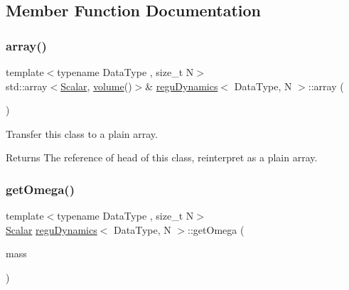 \subsection{Member Function Documentation}
\mbox{\label{classregu_dynamics_aa1c12cfc524f02a52590b2659db79795}} 
\subsubsection{\texorpdfstring{array()}{array()}}
{\footnotesize\ttfamily template$<$typename Data\+Type , size\+\_\+t N$>$ \\
std\+::array$<$\mbox{\hyperlink{classregu_dynamics_a359c55370b4dee032396f0df86ad5fab}{Scalar}}, \mbox{\hyperlink{classregu_dynamics_a3a00b2009ce88898871ca024c30c6882}{volume}}()$>$\& \mbox{\hyperlink{classregu_dynamics}{regu\+Dynamics}}$<$ Data\+Type, N $>$\+::array (\begin{DoxyParamCaption}{ }\end{DoxyParamCaption})\hspace{0.3cm}{\ttfamily [inline]}}



Transfer this class to a plain array. 

\begin{DoxyReturn}{Returns}
The reference of head of this class, reinterpret as a plain array. 
\end{DoxyReturn}
\mbox{\label{classregu_dynamics_a0fe3b4f9a468687ec1f004120b347ddd}} 
\subsubsection{\texorpdfstring{get\+Omega()}{getOmega()}}
{\footnotesize\ttfamily template$<$typename Data\+Type , size\+\_\+t N$>$ \\
\mbox{\hyperlink{classregu_dynamics_a359c55370b4dee032396f0df86ad5fab}{Scalar}} \mbox{\hyperlink{classregu_dynamics}{regu\+Dynamics}}$<$ Data\+Type, N $>$\+::get\+Omega (\begin{DoxyParamCaption}\item[{\mbox{\hyperlink{classregu_dynamics_a34b4b77ea3e49e1cdef584ec8bd281dc}{Scalar\+Array}} \&}]{mass }\end{DoxyParamCaption})\hspace{0.3cm}{\ttfamily [inline]}}



